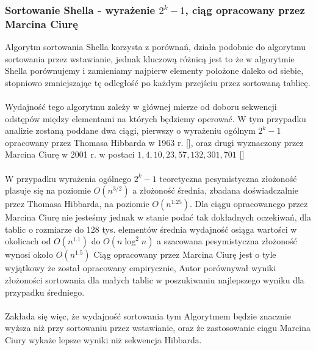 \documentclass{article}
\begin{document}
      \subsubsection{Sortowanie Shella - wyrażenie $2^k - 1$, ciąg opracowany przez Marcina Ciurę}
        Algorytm sortowania Shella korzysta z porównań, działa podobnie do algorytmu sortowania przez wstawianie, jednak kluczową różnicą jest to że w algorytmie Shella porównujemy i zamieniamy najpierw elementy położone daleko od siebie, stopniowo zmniejszając tę odległość po każdym przejściu przez sortowaną tablicę.
        \\\\Wydajność tego algorytmu zależy w głównej mierze od doboru sekwencji odstępów 
        między elementami na których będziemy operować. W tym przypadku analizie zostaną
        poddane dwa ciągi, pierwszy o wyrażeniu ogólnym
        $2^k - 1$ opracowany przez Thomasa Hibbarda w 1963 r. [\cite{10.1145/366552.366557}],
        oraz drugi wyznaczony przez Marcina Ciurę w 2001 r.
        w postaci ${1,4,10,23,57,132,301,701}$ [\cite{CiuraShell}]
        \\\\
        W przypadku wyrażenia ogólnego  $2^k - 1$ teoretyczna pesymistyczna złożoność plasuje się na poziomie $O(n^{3/2})$ a złożoność średnia, zbadana doświadczalnie przez Thomasa Hibbarda, na poziomie $O(n^{1.25})$.
        Dla ciągu opracowanego przez Marcina Ciurę nie jesteśmy jednak w stanie podać tak dokładnych oczekiwań, dla tablic o rozmiarze do 128 tys. elementów średnia wydajność osiąga wartości w okolicach od $O(n^{1.1})$ do $O(n\log^2{n})$ a szacowana pesymistyczna złożoność wynosi około $O(n^{1.5})$
        Ciąg opracowany przez Marcina Ciurę jest o tyle wyjątkowy że został opracowany empirycznie, Autor porównywał wyniki złożoności sortowania dla małych tablic w poszukiwaniu najlepszego wyniku dla przypadku średniego.
        \\\\Zakłada się więc, że wydajność sortowania tym Algorytmem będzie znacznie wyższa niż przy sortowaniu przez wstawianie, oraz że zastosowanie ciągu Marcina Ciury wykaże lepsze wyniki niż sekwencja Hibbarda.
\end{document}

